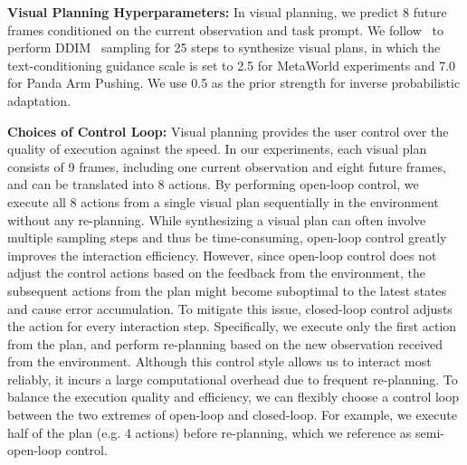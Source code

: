 \begin{table}[ht]
\centering
\setlength{\tabcolsep}{4.8pt}

\vspace{1em}
\caption{\textbf{AnimateDiff Components.} IPA relies on a internet-scale text-to-video model; in this work we use AnimateDiff.  We thus list the size of components of the AnimateDiff checkpoint used.  The checkpoint is used purely for inference, and is not modified or updated in any way. Note that the VAE Decoder is not utilized in our framework.}
\label{table:animatediff_params}
\end{table}

\textbf{Visual Planning Hyperparameters:} In visual planning, we predict 8 future frames conditioned on the current observation and task prompt. We follow~\citep{luo2025solving} to perform DDIM~\citep{song2021ddim} sampling for 25 steps to synthesize visual plans, in which the text-conditioning guidance scale is set to 2.5 for MetaWorld experiments and 7.0 for Panda Arm Pushing. We use 0.5 as the prior strength for inverse probabilistic adaptation.

\textbf{Choices of Control Loop:} Visual planning provides the user control over the quality of execution against the speed. In our experiments, each visual plan consists of 9 frames, including one current observation and eight future frames, and can be translated into 8 actions. By performing open-loop control, we execute all 8 actions from a single visual plan sequentially in the environment without any re-planning. While synthesizing a visual plan can often involve multiple sampling steps and thus be time-consuming, open-loop control greatly improves the interaction efficiency. However, since open-loop control does not adjust the control actions based on the feedback from the environment, the subsequent actions from the plan might become suboptimal to the latest states and cause error accumulation. To mitigate this issue, closed-loop control adjusts the action for every interaction step. Specifically, we execute only the first action from the plan, and perform re-planning based on the new observation received from the environment. Although this control style allows us to interact most reliably, it incurs a large computational overhead due to frequent re-planning. To balance the execution quality and efficiency, we can flexibly choose a control loop between the two extremes of open-loop and closed-loop. For example, we execute half of the plan (e.g. 4 actions) before re-planning, which we reference as semi-open-loop control.

